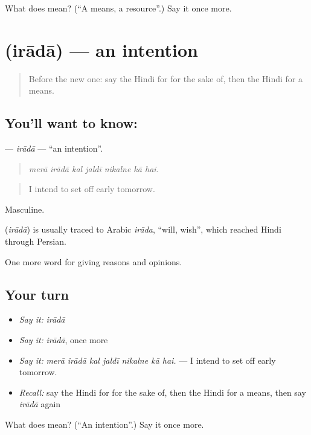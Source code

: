 \begin{tcolorbox}[breakable,colback=teal!4,colframe=teal!35!black,title={Before you move on}]
What does  mean? (\textquotedblleft{}A means, a resource\textquotedblright{}.) Say it once more.
\end{tcolorbox}
\section[\texorpdfstring{\hi{इरादा} (irādā)}{इरादा (irādā)}]{ (irādā) — an intention}

\label{lesson:HI-C345-irada}



\begin{quote}
Before the new one: say the Hindi for for the sake of, then the Hindi for a means.
\end{quote}

\subsection*{You'll want to know: }
\textbf{} — \emph{irādā} — \textquotedblleft{}an intention\textquotedblright{}.

\begin{quote}
      
\end{quote}

\begin{quote}
\emph{merā irādā kal jaldī nikalne kā hai.}
\end{quote}

\begin{quote}
I intend to set off early tomorrow.
\end{quote}

Masculine.

\begin{cousinweb}
\textbf{} (\emph{irādā}) is usually traced to Arabic \emph{irāda}, \textquotedblleft{}will, wish\textquotedblright{}, which reached Hindi through Persian.
\end{cousinweb}

\begin{grammarlens}[title={What you've built}]
One more word for giving reasons and opinions.
\end{grammarlens}

\subsection*{Your turn}
\begin{itemize}
\raggedright
  \item \emph{Say it:} \emph{irādā}
  \item \emph{Say it:} \emph{irādā}, once more
  \item \emph{Say it:} \emph{merā irādā kal jaldī nikalne kā hai.} — I intend to set off early tomorrow.
  \item \emph{Recall:} say the Hindi for for the sake of, then the Hindi for a means, then say \emph{irādā} again
\end{itemize}

\begin{tcolorbox}[breakable,colback=teal!4,colframe=teal!35!black,title={Before you move on}]
What does  mean? (\textquotedblleft{}An intention\textquotedblright{}.) Say it once more.
\end{tcolorbox}
